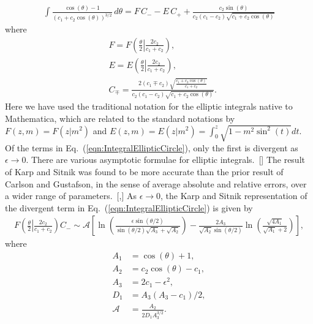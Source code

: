 \documentclass[aps,graphicx,reprint,onecolumn,12pt,tightenlines,longbibliography]{revtex4-1}
\newcommand{\sas}[2]{{#2}}
\begin{document}
\begin{align}\label{eqn:IntegralEllipticCircle}
\int \frac{\cos(\theta) - 1}{(c_{1} + c_{2} \cos(\theta))^{3/2}} \, d\theta = F  \, C_{-}-E  \, C_{+}+\frac{c_{2} \sin (\theta)}{c_{2} (c_{1}-c_{2}) \sqrt{c_{1}+c_{2} \cos (\theta )}}
\end{align}
%
where
%
\begin{align}\label{eqn:coefficients}
&F=F\left(\left.\frac{\theta }{2}\right|\frac{2 c_{2}}{c_{1}+c_{2}}\right), \\
&E=E\left(\left.\frac{\theta }{2}\right|\frac{2 c_{2}}{c_{1}+c_{2}}\right), \\
&C_{\mp}=\frac{2(c_{1}\mp c_{2}) \sqrt{\displaystyle\frac{c_{1}+c_{2} \cos (\theta )}{c_{1}+c_{2}}}}{c_{2} (c_{1}-c_{2}) \sqrt{c_{1}+c_{2} \cos (\theta )}}.
\end{align}
%
\sas{where}{Here} we have used the traditional notation for the elliptic integrals native to Mathematica, which are related to the standard notations by $F(z,m) = F(z|m^{2})$ and $E(z,m) = E(z|m^{2})=\int_{0}^{z} \sqrt{1-m^{2} \sin^{2}(t)}dt$.  Of the terms in Eq.~(\ref{eqn:IntegralEllipticCircle}), only the first is divergent as $\epsilon \to 0$.  There are various asymptotic formulae for elliptic integrals.~[] The result of Karp and Sitnik was found to be more accurate than the prior result of Carlson and Gustafson, in the sense of average absolute and relative errors, over a wider range of parameters.~[,] As $\epsilon\to 0$, the Karp and Sitnik representation of the divergent term in Eq.~(\ref{eqn:IntegralEllipticCircle}) is given by
%
\begin{align}\label{eqn:KS}
 F\left(\left.\frac{\theta }{2}\right|\frac{2 c_{2}}{c_{1}+c_{2}}\right)C_{-}\sim \mathcal{A} \left[ \ln\left(\frac{\epsilon  \sin\left(\theta/2\right)}{\sin(\theta/2)\sqrt{A_{3}}+\sqrt{A_{2}}}\right) -\frac{2A_{3}}{\sqrt{A_{2}}\sin(\theta/2)} \ln\left(\frac{\sqrt{4A_{1}}}{\sqrt{A_{1}}+2}\right)\right],
\end{align}	
%
where
\begin{align}\label{eqn:KSAux}
A_{1} &= \cos(\theta) +1 ,\\
A_{2} &= c_{2} \cos(\theta) - c_{1},\\
A_{3} &= 2c_{1} - \epsilon^{2},\\
D_{1} &= A_{3} (A_{3}-c_{1})/2,\\ 
\mathcal{A} &= \frac{A_{2}}{2D_{1}A_{3}^{3/2}}.
\end{align}
\end{document}
